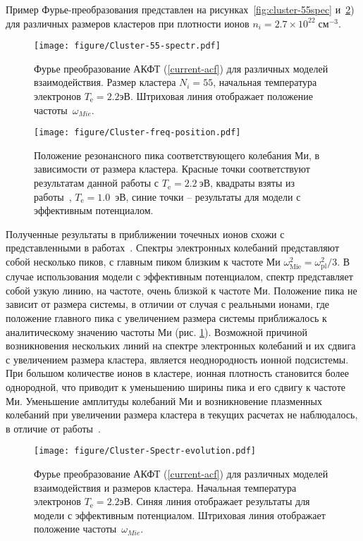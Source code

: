 Пример Фурье-преобразования представлен на рисунках~\ref{fig:cluster-55spec} и~\ref{fig:cluster-SpectrEvolution}) для различных размеров кластеров при плотности ионов $n_i=2.7 \times 10^{22}\;\text{см}^{-3}$.
\begin{figure}[t!]
	\begin{multicols}{2}
		\centering
		
		\texttt{[image: figure/Cluster-55-spectr.pdf]}
		\caption{\label{fig:cluster-55spec}Фурье преобразование АКФТ (\ref{current-acf}) для различных моделей взаимодействия. Размер кластера $N_i=55$, начальная температура электронов $T_\mathrm{e}=2.2 \text{эВ}$.
		Штриховая линия отображает положение частоты~$\omega_{Mie}$.
		}
		\columnbreak

		\centering
		\label{fig:cluster-MiPosition}
		\texttt{[image: figure/Cluster-freq-position.pdf]}
		\caption{Положение резонансного пика соответствующего колебания Ми, в зависимости от размера кластера. Красные точки соответствуют результатам данной работы с $T_\mathrm{e}=2.2~\text{эВ}$, квадраты взяты из работы~\cite{bystryi2014electronic}, $T_\mathrm{e} = 1.0$~эВ, синие точки -- результаты для модели с эффективным потенциалом.}
	\end{multicols}
\end{figure}

Полученные результаты в приближении точечных ионов схожи с представленными в работах~\cite{RRRM-IJMPB08,MB-PRB15}. Спектры электронных колебаний представляют собой несколько пиков, с главным пиком близким к частоте Ми $\omega_\mathrm{Mie}^2=\omega_\mathrm{pl}^2/3$. В случае использования модели с эффективным потенциалом, спектр представляет собой узкую линию, на частоте, очень близкой к частоте Ми. Положение пика не зависит от размера системы, в отличии от случая с реальными ионами, где положение главного пика с увеличением размера системы приближалось к аналитическому значению частоты Ми (рис. \ref{fig:cluster-MiPosition}). Возможной причиной возникновения нескольких линий на спектре электронных колебаний и их сдвига с увеличением размера кластера, является неоднородность ионной подсистемы. При большом количестве ионов в кластере, ионная плотность становится более однородной, что приводит к уменьшению ширины пика и его сдвигу к частоте Ми.  Уменьшение амплитуды колебаний Ми и возникновение плазменных колебаний при увеличении размера кластера в текущих расчетах не наблюдалось, в отличие от работы~\cite{MB-PRB15}.

\begin{figure}[h!]
	\centering
	
	\texttt{[image: figure/Cluster-Spectr-evolution.pdf]}
	\caption{\label{fig:cluster-SpectrEvolution}Фурье преобразование АКФТ (\ref{current-acf}) для различных моделей взаимодействия и размеров кластера. Начальная температура электронов $T_\mathrm{e}=2.2 \text{эВ}$. Синяя линия отображает результаты для модели с эффективным потенциалом.
		Штриховая линия отображает положение частоты~$\omega_{Mie}$.
	}
\end{figure}


